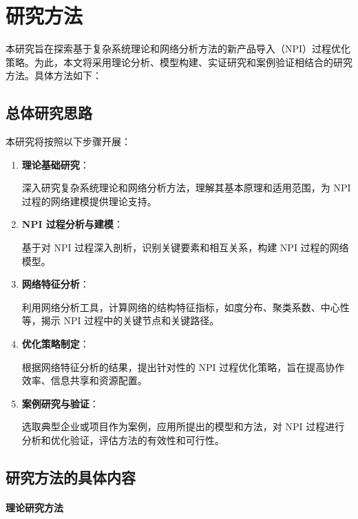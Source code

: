 \chapter{研究方法}

本研究旨在探索基于复杂系统理论和网络分析方法的新产品导入（NPI）过程优化策略。为此，本文将采用理论分析、模型构建、实证研究和案例验证相结合的研究方法。具体方法如下：

\section{总体研究思路}

本研究将按照以下步骤开展：

\begin{enumerate}
  \item \textbf{理论基础研究}：

  深入研究复杂系统理论和网络分析方法，理解其基本原理和适用范围，为 NPI 过程的网络建模提供理论支持。

  \item \textbf{NPI 过程分析与建模}：

  基于对 NPI 过程深入剖析，识别关键要素和相互关系，构建 NPI 过程的网络模型。

  \item \textbf{网络特征分析}：

  利用网络分析工具，计算网络的结构特征指标，如度分布、聚类系数、中心性等，揭示 NPI 过程中的关键节点和关键路径。

  \item \textbf{优化策略制定}：

  根据网络特征分析的结果，提出针对性的 NPI 过程优化策略，旨在提高协作效率、信息共享和资源配置。

  \item \textbf{案例研究与验证}：

  选取典型企业或项目作为案例，应用所提出的模型和方法，对 NPI 过程进行分析和优化验证，评估方法的有效性和可行性。

\end{enumerate}

\section{研究方法的具体内容}

\subsubsection{理论研究方法}

